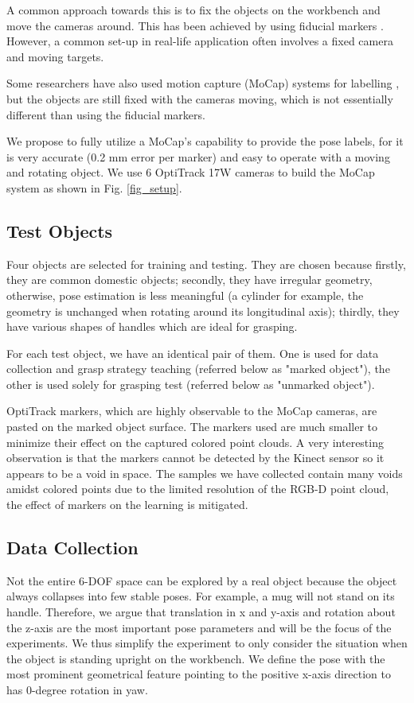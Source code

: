 \documentclass[conference]{IEEEtran}
\begin{document}
A common approach towards this is to fix the objects on the workbench and move the cameras around. This has been achieved by using fiducial markers \cite{brachmann_2014_eccv}. However, a common set-up in real-life application often involves a fixed camera and moving targets. 

Some researchers have also used motion capture (MoCap) systems for labelling \cite{wong_2017_iros}, but the objects are still fixed with the cameras moving, which is not essentially different than using the fiducial markers.

We propose to fully utilize a MoCap's capability to provide the pose labels, for it is very accurate (0.2 mm error per marker) and easy to operate with a moving and rotating object. We use 6 OptiTrack 17W cameras to build the MoCap system as shown in Fig. \ref{fig_setup}.

\subsection{Test Objects}
Four objects are selected for training and testing. They are chosen because firstly, they are common domestic objects; secondly, they have irregular geometry, otherwise, pose estimation is less meaningful (a cylinder for example, the geometry is unchanged when rotating around its longitudinal axis); thirdly, they have various shapes of handles which are ideal for grasping.

For each test object, we have an identical pair of them. One is used for data collection and grasp strategy teaching (referred below as "marked object"), the other is used solely for grasping test (referred below as "unmarked object").

OptiTrack markers, which are highly observable to the MoCap cameras, are pasted on the marked object surface. The markers used are much smaller to minimize their effect on the captured colored point clouds. A very interesting observation is that the markers cannot be detected by the Kinect sensor so it appears to be a void in space. The samples we have collected contain many voids amidst colored points due to the limited resolution of the RGB-D point cloud, the effect of markers on the learning is mitigated.

\subsection{Data Collection}
Not the entire 6-DOF space can be explored by a real object because the object always collapses into few stable poses. For example, a mug will not stand on its handle. Therefore, we argue that translation in x and y-axis and rotation about the z-axis are the most important pose parameters and will be the focus of the experiments. We thus simplify the experiment to only consider the situation when the object is standing upright on the workbench. We define the pose with the most prominent geometrical feature pointing to the positive x-axis direction to has 0-degree rotation in yaw. 
\end{document}
